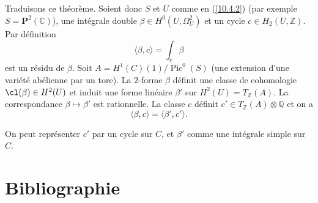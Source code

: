 \documentclass[12pt,a4paper]{amsart}
\theoremstyle{plain}
\theoremstyle{definition}
\theoremstyle{remark}
\DeclareMathOperator{\Pic}{Pic}
\numberwithin{equation}{section}
\begin{document}
\subsection{}\label{10.4.4}
Traduisons ce théorème. Soient donc $S$ et $U$ comme en (\ref{10.4.2}) (par exemple $S=\mathbf{P}^2(\mathbb{C})$), une intégrale double $\beta\in H^0(U,\Omega_U^2)$ et un cycle $c\in H_2(U,\mathbb{Z})$. Par définition
\[
\langle\beta,c\rangle=\int_c\beta
\]
est un résidu de $\beta$. Soit $A=H^1(C)(1)/\Pic^0(S)$ (une extension d'une variété abélienne par un tore). La $2$-forme $\beta$ définit une classe de cohomologie $\cl(\beta)\in H^2(U)$ et induit une forme linéaire $\beta'$ sur $H^2(U)=T_\mathbb{Z}(A)$. La correspondance $\beta\mapsto\beta'$ est rationnelle. La classe $c$ définit $c'\in T_\mathbb{Z}(A)\otimes\mathbb{Q}$ et on a
\begin{equation}\label{eq:10.4.4.1}
\langle\beta,c\rangle=\langle\beta',c'\rangle.
\end{equation}

On peut représenter $c'$ par un cycle sur $C$, et $\beta'$ comme une intégrale simple sur $C$.

\section*{Bibliographie}
\end{document}
